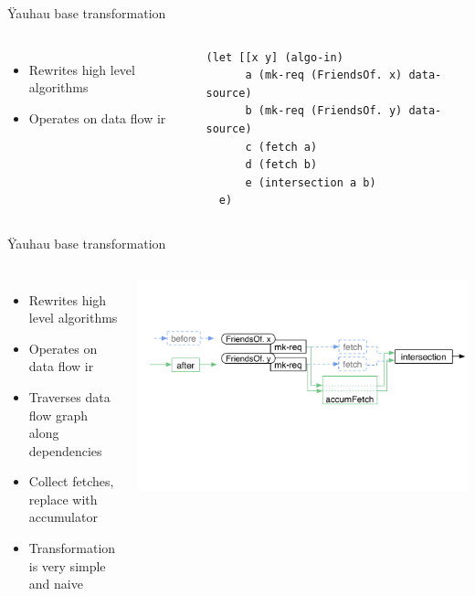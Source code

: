 \documentclass[utf8x,10pt,aspectratio=169]{beamer}
\begin{document}
\addtocounter{framenumber}{-1}

\begin{frame}[fragile]{Ÿauhau base transformation}
	
	\begin{columns}[T]
		\begin{itemize}
			\item Rewrites high level algorithms
			\item Operates on data flow ir
		\end{itemize}	
		\begin{verbatim}
(let [[x y] (algo-in)
      a (mk-req (FriendsOf. x) data-source)
      b (mk-req (FriendsOf. y) data-source)
      c (fetch a)
      d (fetch b)
      e (intersection a b)
  e)
		\end{verbatim}
	\end{columns}
	
\end{frame}

\addtocounter{framenumber}{-1}

\begin{frame}[fragile]{Ÿauhau base transformation}
	
	\begin{columns}[T]
		\begin{itemize}
			\item Rewrites high level algorithms
			\item Operates on data flow ir
			\item Traverses data flow graph along dependencies
			\item<2-> Collect fetches, replace with accumulator
			\item<3-> Transformation is very simple and naive
		\end{itemize}	
		\includegraphics[width=\textwidth]{graphs/yauhau-transformation}
	\end{columns}
	
\end{frame}
\end{document}

